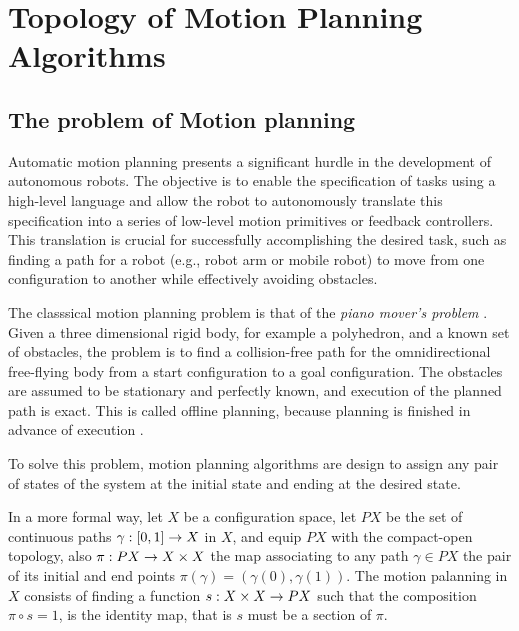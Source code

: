 \chapter{Topology of Motion Planning Algorithms}

\section{The problem of Motion planning}

Automatic motion planning presents a significant hurdle in the development of autonomous robots. The objective is to enable the specification of tasks using a high-level language and allow the robot to autonomously translate this specification into a series of low-level motion primitives or feedback controllers. This translation is crucial for successfully accomplishing the desired task, such as finding a path for a robot (e.g., robot arm or mobile robot) to move from one configuration to another while effectively avoiding obstacles.

The classsical motion planning problem is that of the \textit{piano mover's problem} \cite{schwartz:1983a}. Given a three dimensional rigid body, for example a polyhedron, and a known set of obstacles, the problem is to find a collision-free path for the omnidirectional free-flying body from a start configuration to a goal configuration. The obstacles are assumed to be stationary and perfectly known, and execution of the planned path is exact. This is called offline planning, because planning is finished in advance of execution \cite{choset2005principles}.


To solve this problem, motion planning algorithms are design to assign any pair of states of the system at the initial state and ending at the desired state.

In a more formal way, let $X$ be a configuration space, let $PX$ be the set of continuous paths $\displaystyle \gamma : [0,1] \rightarrow X$ in $X$, and equip $PX$ with the compact-open topology, also $\pi : PX \rightarrow X \times X$ the map associating to any path $\gamma \in PX$ the pair of its initial and end points $\pi(\gamma) = (\gamma(0), \gamma(1))$. The motion palanning in $X$ consists of finding a function $s : X \times X \rightarrow PX$ such that the composition $\pi \circ s = 1$, is the identity map, that is $s$ must be a section of $\pi$.

